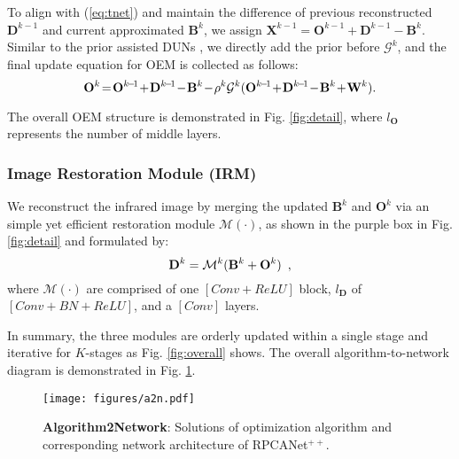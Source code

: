 \documentclass[10pt,journal,compsoc]{IEEEtran}
\begin{document}
To align with (\ref{eq:tnet}) and maintain the difference of previous reconstructed $\mathbf{D}^{k - 1}$ and current approximated $\mathbf{B}^{k}$, we assign $\textbf{X}^{k-1} = {\mathbf{O}^{k - 1}}\!+\!{\mathbf{D}^{k - 1}}\!-\!{\mathbf{B}^k}$. Similar to the prior assisted DUNs \cite{zhang-2021-prior, yang-2022-prior,wei-2022-prior}, we directly add the prior before ${{\mathcal{G}}^k}$, and the final update equation for OEM is collected as follows:
\begin{equation}
\setlength{\abovedisplayskip}{2pt}
\setlength{\belowdisplayskip}{2pt}
{{\bf{O}}^k\!=\!{{\bf{O}}^{k\!-\!1}}\!+\!{{\bf{D}}^{k\!-\!1}}\!-\!{{\bf{B}}^k}\!-\!{\rho ^k}{{\mathcal{G}}^k}({{\bf{O}}^{k\!-\!1}}\!+\!{{\bf{D}}^{k\!-\!1}}\!-\!{{\bf{B}}^k}\!+\!{{\bf{W}}^k})}.
\label{tnet}
\end{equation}

The overall OEM structure is demonstrated in Fig. \ref{fig:detail}, where $l_{\mathbf{O}}$ represents the number of middle layers. 

\subsubsection{Image Restoration Module (IRM)} 
We reconstruct the infrared image by merging the updated $\mathbf{B}^{k}$ and $\mathbf{O}^{k}$ via an simple yet efficient restoration module $\mathcal{M}(\cdot)$, as shown in the purple box in Fig. \ref{fig:detail} and formulated by:
\begin{equation}
\setlength{\abovedisplayskip}{2pt}
\setlength{\belowdisplayskip}{2pt}
{{\bf{D}}^k} = {\mathcal{M}^k}({{\bf{B}}^k} + {{\bf{O}}^k})\enspace,
\end{equation}
where $\mathcal{M}(\cdot)$ are comprised of one $[Conv + ReLU]$ block, $l_{\mathbf{D}}$ of $[Conv + BN + ReLU]$, and a $[Conv]$ layers.

In summary, the three modules are orderly updated within a single stage and iterative for $K$-stages as Fig. \ref{fig:overall} shows. The overall algorithm-to-network diagram is demonstrated in Fig. \ref{fig:a2n}.

\begin{figure}[!t]
\setlength{\abovecaptionskip}{0.1cm}
\setlength{\belowcaptionskip}{0cm}
    \centering
    \texttt{[image: figures/a2n.pdf]}
    \caption{\textbf{Algorithm2Network}: Solutions of optimization algorithm and corresponding network architecture of RPCANet$^{++}$.}
    \vspace{-0.4cm}
    \label{fig:a2n}
\end{figure}
\end{document}

